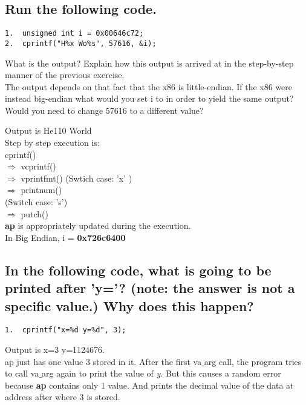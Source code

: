 \documentclass[a4paper]{article}
\begin{document}
		 \subsection{Run the following code.}
		 \begin{minipage}{0.4\textwidth}
\begin{lstlisting}
1.	unsigned int i = 0x00646c72;
2.	cprintf("H%x Wo%s", 57616, &i);
\end{lstlisting}	
\textbullet \quad What is the output? Explain how this output is arrived at in the step-by-step manner of the previous exercise. \\
\textbullet \quad The output depends on that fact that the x86 is little-endian. If the x86 were instead big-endian what would you set i to in order to yield the same output? Would you need to change 57616 to a different value?
		 \end{minipage}
		 \vrule
		 \raggedright
		 \begin{minipage}{0.1\textwidth}
		 	\phantom{A}
		 \end{minipage}
		 \begin{minipage}{0.5\textwidth}
			Output is He110 World \\
			Step by step execution is:\\
			cprintf() \\
			$\Rightarrow$ vcprintf() \\
			$\Rightarrow$ vprintfmt() (Swtich case: 'x' )\\
			$\Rightarrow$ printnum() \\
			(Switch case: 's') \\ 
			$\Rightarrow$ putch() \\
			\textbf{ap} is appropriately updated during the execution. \\
			In Big Endian, i = \textbf{0x726c6400}
		 \end{minipage}
		 \subsection{In the following code, what is going to be printed after 'y='? (note: the answer is not a specific value.) Why does this happen? }
		 \begin{minipage}{0.4\textwidth}
\begin{lstlisting}
1.	cprintf("x=%d y=%d", 3);
\end{lstlisting}
		 \end{minipage}
		 \vrule
		 \raggedright
		 \begin{minipage}{0.1\textwidth}
		 	\phantom{A}
		 \end{minipage}
		 \begin{minipage}{0.5\textwidth}
			Output is x=3 y=1124676.\\
			ap just has one value 3 stored in it. After the first va$\_$arg call, the program tries to call va$\_$arg again to print the value of \emph{y}. But this causes a random error because \textbf{ap} contains only 1 value. And prints the decimal value of the data at address after where 3 is stored.
		 \end{minipage}
\end{document}
